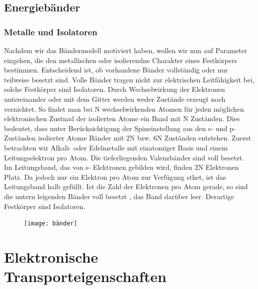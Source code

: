 \documentclass[11pt]{article}
\begin{document}
\subsection{Energiebänder}
\subsubsection{Metalle und Isolatoren}
Nachdem wir das Bändermodell motiviert haben, wollen wir nun auf Parameter
eingehen, die den metallischen oder isolierendne Charakter eines Festkörpers
bestimmen. Entscheidend ist, ob vorhandene Bänder vollständig oder nur teilweise
besetzt sind. Volle Bänder tragen nicht zur elektrischen Leitfähigkeit bei,
solche Festkörper sind Isolatoren. Durch Wechselwirkung der Elektronen
untereinander oder mit dem Gitter werden weder Zustände erzeugt noch vernichtet.
So findet man bei N wechselwirkenden Atomen für jeden möglichen elektronischen
Zustnad der isolierten Atome ein Band mit N Zuständen. Dies bedeutet, dass unter
Berücksichtigung der Spineinstellung aus den s- und p-Zuständen isolierter Atome
Bänder mit 2N bzw. 6N Zuständen entstehen. Zuerst betrachten wir Alkali- oder
Edelmetalle mit einatomiger Basis und einem Leitungselektron pro Atom. Die
tieferliegenden Valenzbänder sind voll besetzt. Im Leitungsband, das von s-
Elektronen gebilden wird, finden 2N Elektronen Platz. Da jedoch nur ein Elektron
pro Atom zur Verfügung sthet, ist das Leitungsband halb gefüllt. Ist die Zahl
der Elektronen pro Atom gerade, so sind die untern leigenden Bänder voll besetzt
, das Band darüber leer. Derartige Festkörper sind Isolatoren.
\begin{figure}[h]
\texttt{[image: bänder]}
\centering
\label{fig:bänder}
\end{figure}
\section{Elektronische Transporteigenschaften}
\end{document}
